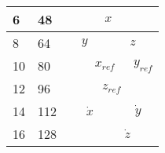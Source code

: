 \begin{table}[H]
\begin{tabular}{llclllllllllllllll}
\multicolumn{1}{|l|}{6}    & \multicolumn{1}{l|}{48}  & \multicolumn{3}{c|}{}                                                    & \multicolumn{10}{c|}{$x$}                                                                                                                                                                                                                                  & \multicolumn{3}{l|}{}                                                       \\ \hline
\multicolumn{1}{|l|}{8}    & \multicolumn{1}{l|}{64}  & \multicolumn{7}{c|}{$y$}                                                                                                                                                     & \multicolumn{9}{c|}{$z$}                                                                                                                                                                                                             \\ \hline
\multicolumn{1}{|l|}{10}   & \multicolumn{1}{l|}{80}  & \multicolumn{1}{c|}{}  & \multicolumn{10}{c|}{$x_{ref}$}                                                                                                                                                                                                                          & \multicolumn{5}{c|}{$y_{ref}$}                                                                                                  \\ \hline
\multicolumn{1}{|l|}{12}   & \multicolumn{1}{l|}{96}  & \multicolumn{5}{c|}{}                                                                                                      & \multicolumn{10}{c|}{$z_{ref}$}                                                                                                                                                                                                                              & \multicolumn{1}{l|}{}   \\ \hline
\multicolumn{1}{|l|}{14}   & \multicolumn{1}{l|}{112} & \multicolumn{10}{c|}{$\dot{x}$}                                                                                                                                                                                                                         & \multicolumn{6}{c|}{$\dot{y}$}                                                                                                                            \\ \hline
\multicolumn{1}{|l|}{16}   & \multicolumn{1}{l|}{128} & \multicolumn{5}{l|}{}                                                                                                      & \multicolumn{11}{c|}{$\dot{z}$}                                                                                                                                                                                                                                                        \\ \hline

\end{tabular}
\end{table}
